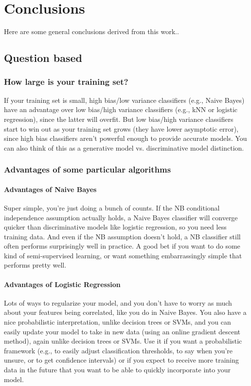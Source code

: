 \documentclass[12pt]{book}
\begin{document}
\chapter{Conclusions}

Here are some general conclusions derived from this work..

\section{Question based}
\subsection{How large is your training set?}
If your training set is small, high bias/low variance classifiers (e.g., Naive Bayes) have an advantage over low bias/high variance classifiers (e.g., kNN or logistic regression), since the latter will overfit. But low bias/high variance classifiers start to win out as your training set grows (they have lower asymptotic error), since high bias classifiers aren't powerful enough to provide accurate models. 
You can also think of this as a generative model vs. discriminative model distinction.

\subsection{Advantages of some particular algorithms}
\subsubsection{Advantages of Naive Bayes} Super simple, you're just doing a bunch of counts. If the NB conditional independence assumption actually holds, a Naive Bayes classifier will converge quicker than discriminative models like logistic regression, so you need less training data. And even if the NB assumption doesn't hold, a NB classifier still often performs surprisingly well in practice. A good bet if you want to do some kind of semi-supervised learning, or want something embarrassingly simple that performs pretty well.

\subsubsection{Advantages of Logistic Regression} Lots of ways to regularize your model, and you don't have to worry as much about your features being correlated, like you do in Naive Bayes. You also have a nice probabilistic interpretation, unlike decision trees or SVMs, and you can easily update your model to take in new data (using an online gradient descent method), again unlike decision trees or SVMs. Use it if you want a probabilistic framework (e.g., to easily adjust classification thresholds, to say when you're unsure, or to get confidence intervals) or if you expect to receive more training data in the future that you want to be able to quickly incorporate into your model.
\end{document}
